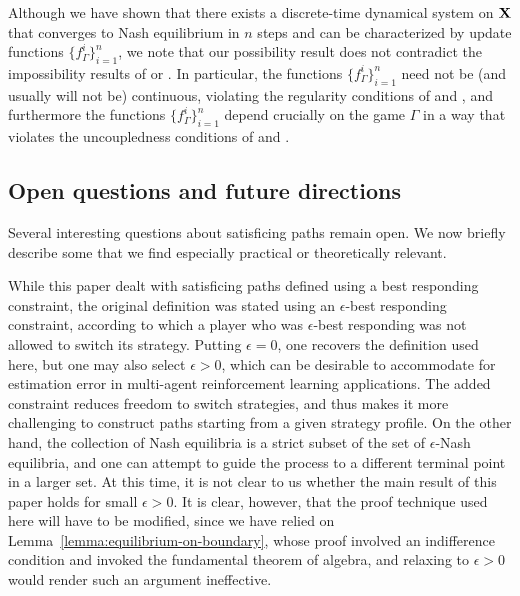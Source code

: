 {Although we have shown that there exists a discrete-time dynamical system on ${\mathbf{X}}$ that converges to Nash equilibrium in $n$ steps and can be characterized by update functions $\{ f^i_{\Gamma} \}_{i=1}^n$, we note that our possibility result does not contradict the impossibility results of \cite{hart2003uncoupled, babichenko2012completely} or \cite{milionis2023impossibility}. In particular, the functions $\{ f^i_{\Gamma} \}_{i=1}^n$ need not be (and usually will not be) continuous, violating the regularity conditions of \cite{hart2003uncoupled} and \cite{milionis2023impossibility}, and furthermore the functions $\{ f^i_{\Gamma} \}_{i=1}^n$ depend crucially on the game $\Gamma$ in a way that violates the uncoupledness conditions of \cite{hart2003uncoupled} and \cite{babichenko2012completely}.

 

\subsection*{Open questions and future directions}

Several interesting questions about satisficing paths remain open. We now briefly describe some that we find especially practical or theoretically relevant.


While this paper dealt with satisficing paths defined using a best responding constraint, the original definition was stated using an $\epsilon$-best responding constraint, according to which a player who was $\epsilon$-best responding was not allowed to switch its strategy. Putting $\epsilon = 0$, one recovers the definition used here, but one may also select $\epsilon > 0$, which can be desirable to accommodate for estimation error in multi-agent reinforcement learning applications. The added constraint reduces freedom to switch strategies, and thus makes it more challenging to construct paths starting from a given strategy profile. On the other hand, the collection of Nash equilibria is a strict subset of the set of $\epsilon$-Nash equilibria, and one can attempt to guide the process to a different terminal point in a larger set. At this time, it is not clear to us whether the main result of this paper holds for small $\epsilon > 0$. It is clear, however, that the proof technique used here will have to be modified, since we have relied on Lemma~\ref{lemma:equilibrium-on-boundary}, whose proof involved an indifference condition and invoked the fundamental theorem of algebra, and relaxing to $\epsilon > 0$ would render such an argument ineffective. 


}
